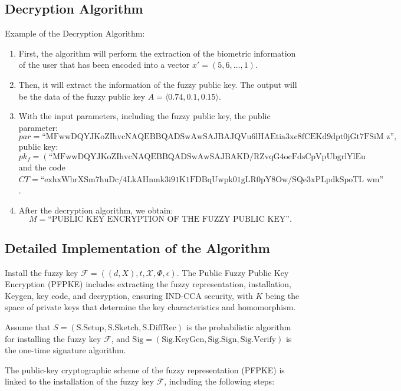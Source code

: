 \documentclass[graybox]{svmult}
\begin{document}
\subsection{Decryption Algorithm}

Example of the Decryption Algorithm:
\begin{enumerate}
    \item First, the algorithm will perform the extraction of the biometric information of the user that has been encoded into a vector $x' = (5, 6, \dots, 1)$.
    \item Then, it will extract the information of the fuzzy public key. The output will be the data of the fuzzy public key $A = \langle 0.74, 0.1, 0.15 \rangle$.
    \item With the input parameters, including the fuzzy public key, the public parameter:
          \[
              par = \text{``MFwwDQYJKoZIhvcNAQEBBQADSwAwSAJBAJQVu6lHAEtia3xc8fCEKd9dpt0jGt7FSiM z''},
          \]
          public key:
          \[
              pk_f = (\text{``MFwwDQYJKoZIhvcNAQEBBQADSwAwSAJBAKD/RZvqG4ocFdsCpVpUbgrlYlEu mD9qebAIVm3gv1Y6XN7w6jf2B4V9soP9jbXcmwEDy/N6xognyuqKAEB81JUCAwEAAQ==,''}, \dots),
          \]
          and the code $CT = \text{``exhxWbrXSm7huDc/4LkAHnmk3i91K1FDBqUwpk01gLR0pY8Ow/SQe3xPLpdkSpoTL wm''}$.
    \item After the decryption algorithm, we obtain:
          \[
              M = \text{``PUBLIC KEY ENCRYPTION OF THE FUZZY PUBLIC KEY''}.
          \]
\end{enumerate}

\subsection{Detailed Implementation of the Algorithm}
Install the fuzzy key $\mathcal{F} = ((d, X), t, \mathcal{X}, \Phi, \epsilon)$. The Public Fuzzy Public Key Encryption (PFPKE) includes extracting the fuzzy representation, installation, Keygen, key code, and decryption, ensuring IND-CCA security, with $K$ being the space of private keys that determine the key characteristics and homomorphism.

Assume that $S = (\text{S.Setup}, \text{S.Sketch}, \text{S.DiffRec})$ is the probabilistic algorithm for installing the fuzzy key $\mathcal{F}$, and $\text{Sig} = (\text{Sig.KeyGen}, \text{Sig.Sign}, \text{Sig.Verify})$ is the one-time signature algorithm.

The public-key cryptographic scheme of the fuzzy representation (PFPKE) is linked to the installation of the fuzzy key $\mathcal{F}$, including the following steps:
\end{document}
